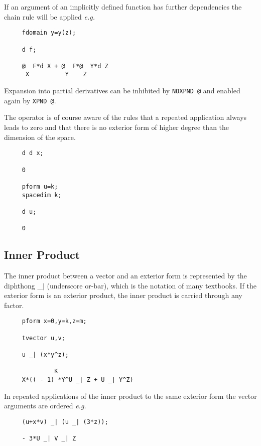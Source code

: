 If an argument of an implicitly defined function has further
dependencies the chain rule will be applied {\em e.g.} 


\begin{verbatim}
     fdomain y=y(z);

     d f;

     @  F*d X + @  F*@  Y*d Z
      X          Y    Z
\end{verbatim}

Expansion into partial derivatives can be inhibited by
{\tt NOXPND @}\label{NOXPNDA}
and enabled again by {\tt XPND @}\label{XPNDA}.
 

The operator is of course aware of the rules that a repeated
application always leads to zero and that there is no exterior form of
higher degree than the dimension of the space.

\begin{verbatim}
     d d x;

     0

     pform u=k;
     spacedim k;

     d u;

     0
\end{verbatim}
\subsection{Inner Product}
The inner product between a vector and an exterior form is represented
by the diphthong \_$|$ \label{innerp} (underscore or-bar), which is the
notation of many textbooks.  If the exterior form is an exterior
product, the inner product is carried through any factor.

\example{}

\begin{verbatim}
     pform x=0,y=k,z=m;

     tvector u,v;

     u _| (x*y^z);

              K
     X*(( - 1) *Y^U _| Z + U _| Y^Z)
\end{verbatim}

In repeated applications of the inner product to the same exterior
form the vector arguments are ordered {\em e.g.}

\begin{verbatim}
     (u+x*v) _| (u _| (3*z));

     - 3*U _| V _| Z
\end{verbatim}

